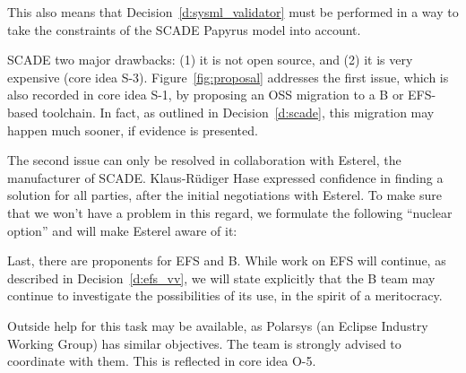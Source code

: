 This also means that Decision~\ref{d:sysml_validator} must be performed in a way to take the constraints of the  SCADE Papyrus model into account.


SCADE two major drawbacks: (1) it is not open source, and (2) it is very expensive (core idea S-3).  Figure~\ref{fig:proposal} addresses the first issue, which is also recorded in core idea S-1, by proposing an OSS migration to a B or EFS-based toolchain.  In fact, as outlined in Decision~\ref{d:scade}, this migration may happen much sooner, if evidence is presented. 


The second issue can only be resolved in collaboration with Esterel, the manufacturer of SCADE.  Klaus-Rüdiger Hase expressed confidence in finding a solution for all parties, after the initial negotiations with Esterel.  To make sure that we won't have a problem in this regard, we formulate the following ``nuclear option'' and will make Esterel aware of it:


Last, there are proponents for EFS and B.  While work on EFS will continue, as described in Decision~\ref{d:efs_vv}, we will state explicitly that the B team may continue to investigate the possibilities of its use, in the spirit of a meritocracy.

Outside help for this task may be available, as Polarsys (an Eclipse Industry Working Group) has similar objectives.  The team is strongly advised to coordinate with them. This is reflected in core idea O-5.

